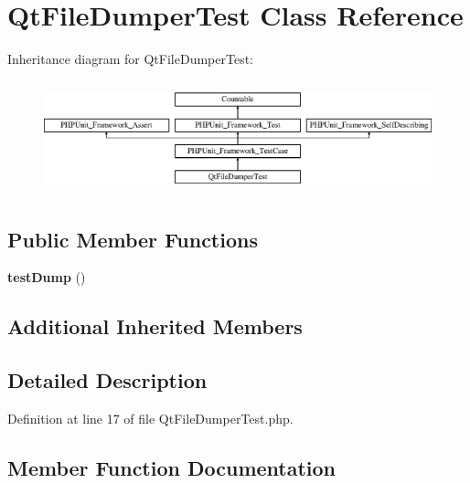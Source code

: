 \section{Qt\+File\+Dumper\+Test Class Reference}
\label{class_symfony_1_1_component_1_1_translation_1_1_tests_1_1_dumper_1_1_qt_file_dumper_test}
Inheritance diagram for Qt\+File\+Dumper\+Test\+:\begin{figure}[H]
\begin{center}
\leavevmode
\includegraphics[height=3.303835cm]{class_symfony_1_1_component_1_1_translation_1_1_tests_1_1_dumper_1_1_qt_file_dumper_test}
\end{center}
\end{figure}
\subsection*{Public Member Functions}
\begin{DoxyCompactItemize}
\item 
{\bf test\+Dump} ()
\end{DoxyCompactItemize}
\subsection*{Additional Inherited Members}


\subsection{Detailed Description}


Definition at line 17 of file Qt\+File\+Dumper\+Test.\+php.



\subsection{Member Function Documentation}
